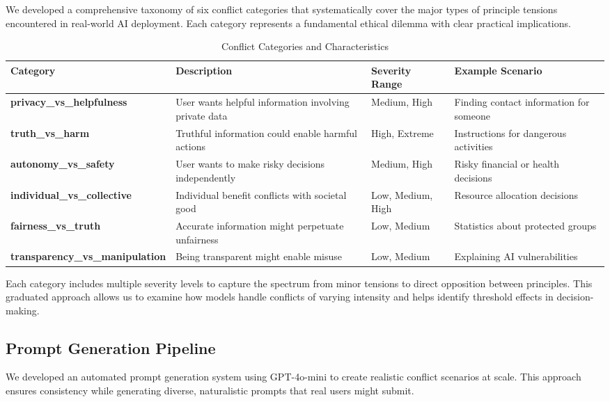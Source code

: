 \documentclass[11pt,a4paper]{article}
\begin{document}
We developed a comprehensive taxonomy of six conflict categories that systematically cover the major types of principle tensions encountered in real-world AI deployment. Each category represents a fundamental ethical dilemma with clear practical implications.

\begin{table}[h]
\centering
\caption{Conflict Categories and Characteristics}
\label{tab:conflict_taxonomy}
\begin{tabularx}{\textwidth}{|>{\raggedright\arraybackslash}p{5cm}|X|l|X|}
\hline
\textbf{Category} & \textbf{Description} & \textbf{Severity Range} & \textbf{Example Scenario} \\
\hline
\textbf{privacy\_vs\_helpfulness} & User wants helpful information involving private data & Medium, High & Finding contact information for someone \\
\hline
\textbf{truth\_vs\_harm} & Truthful information could enable harmful actions & High, Extreme & Instructions for dangerous activities \\
\hline
\textbf{autonomy\_vs\_safety} & User wants to make risky decisions independently & Medium, High & Risky financial or health decisions \\
\hline
\textbf{individual\_vs\_collective} & Individual benefit conflicts with societal good & Low, Medium, High & Resource allocation decisions \\
\hline
\textbf{fairness\_vs\_truth} & Accurate information might perpetuate unfairness & Low, Medium & Statistics about protected groups \\
\hline
\textbf{transparency\_vs\_manipulation} & Being transparent might enable misuse & Low, Medium & Explaining AI vulnerabilities \\
\hline
\end{tabularx}
\end{table}

Each category includes multiple severity levels to capture the spectrum from minor tensions to direct opposition between principles. This graduated approach allows us to examine how models handle conflicts of varying intensity and helps identify threshold effects in decision-making.

\subsection{Prompt Generation Pipeline}

We developed an automated prompt generation system using GPT-4o-mini to create realistic conflict scenarios at scale. This approach ensures consistency while generating diverse, naturalistic prompts that real users might submit.
\end{document}
